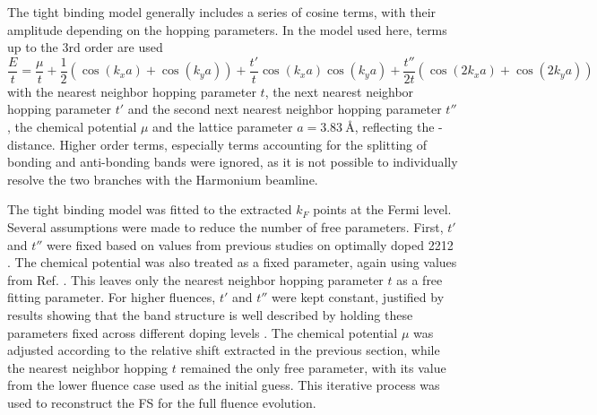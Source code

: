 The tight binding model generally includes a series of cosine terms, with their amplitude depending on the hopping parameters.
In the model used here, terms up to the 3rd order are used
\begin{equation}
	\frac{E}{t} = \frac{\mu}{t} + \frac{1}{2} \left(\cos(k_xa)+\cos(k_ya)\right) + \frac{t'}{t} \cos(k_xa)\cos(k_ya) + \frac{t''}{2t} \left(\cos(2k_xa)+\cos(2k_ya)\right)
\end{equation}
with the nearest neighbor hopping parameter $t$, the next nearest neighbor hopping parameter $t'$ and the second next nearest neighbor hopping parameter $t''$, the chemical potential $\mu$ and the lattice parameter $a=\qty{3.83}{\angstrom}$, reflecting the - distance.
Higher order terms, especially terms accounting for the splitting of bonding and anti-bonding bands were ignored, as it is not possible to individually resolve the two branches with the Harmonium beamline.

The tight binding model was fitted to the extracted $k_F$ points at the Fermi level.
Several assumptions were made to reduce the number of free parameters.
First, $t'$ and $t''$ were fixed based on values from previous studies on optimally doped 2212 \cite{kondo_hole-concentration_2004}.
The chemical potential was also treated as a fixed parameter, again using values from Ref. \cite{kondo_hole-concentration_2004}.
This leaves only the nearest neighbor hopping parameter $t$ as a free fitting parameter.
For higher fluences, $t'$ and $t''$ were kept constant, justified by results showing that the band structure is well described by holding these parameters fixed across different doping levels \cite{drozdov_phase_2018}.
The chemical potential $\mu$ was adjusted according to the relative shift extracted in the previous section, while the nearest neighbor hopping $t$ remained the only free parameter, with its value from the lower fluence case used as the initial guess.
This iterative process was used to reconstruct the FS for the full fluence evolution.

